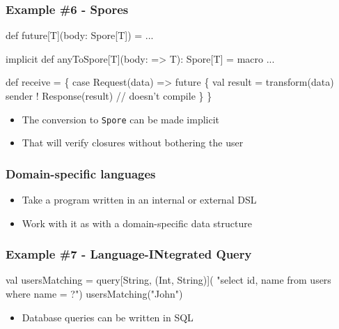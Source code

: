 \documentclass[svgnames,hyperref={bookmarks=false}]{beamer}
\begin{document}
\begin{frame}[fragile, t]
\frametitle{Example \#6 - Spores}

\begin{semiverbatim}
def future[T](body: Spore[T]) = ...

\alert{implicit def anyToSpore[T](body: => T): Spore[T] = macro ...}

def receive = \{
  case Request(data) =>
    future \alert{\{}
      val result = transform(data)
      sender ! Response(result) \alert{// doesn't compile}
    \alert{\}}
\}

\end{semiverbatim}

\begin{itemize}
\item The conversion to \texttt{Spore} can be made implicit
\item That will verify closures without bothering the user
\end{itemize}
\end{frame}

\begin{frame}[fragile]
\frametitle{}

\vskip40pt
\begin{center}
\end{center}
\end{frame}

\begin{frame}[fragile]
\frametitle{Domain-specific languages}

\begin{itemize}
\item Take a program written in an internal or external DSL
\item Work with it as with a domain-specific data structure
\end{itemize}
\end{frame}

\begin{frame}[fragile, t]
\frametitle{Example \#7 - Language-INtegrated Query}

\begin{semiverbatim}
val usersMatching = query[String, (Int, String)](
  "select id, name from users where name = ?")
usersMatching("John")



\end{semiverbatim}

\begin{itemize}
\item Database queries can be written in SQL
\end{itemize}
\end{frame}
\end{document}
